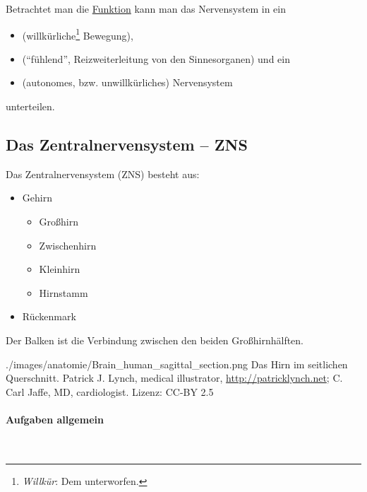 Betrachtet man die \underline{Funktion} kann man das
Nervensystem in ein

\begin{itemize}
\item {} (willkürliche\footnote{\emph{Willkür}: Dem  unterworfen.} Bewegung),
\item {} ("`fühlend"', Reizweiterleitung von
den Sinnesorganen) und ein
\item {} (autonomes, bzw. unwillkürliches)
Nervensystem
\end{itemize}

unterteilen. 

\subsection{Das Zentralnervensystem -- ZNS}
\label{topic:zns}

{
Das Zentralnervensystem (ZNS) besteht aus:

\begin{itemize}
    \item Gehirn
    \begin{itemize}
        \item Großhirn
        \item Zwischenhirn
        \item Kleinhirn
        \item Hirnstamm
    \end{itemize}
    \item Rückenmark
\end{itemize}

Der Balken ist die Verbindung zwischen den beiden Großhirnhälften.

}{}
{./images/anatomie/Brain_human_sagittal_section.png}
{Das Hirn im seitlichen Querschnitt.}
{Patrick J. Lynch, medical illustrator,
\url{http://patricklynch.net}; C. Carl Jaffe, MD,
cardiologist. Lizenz: CC-BY 2.5}


\paragraph{Aufgaben allgemein}~

